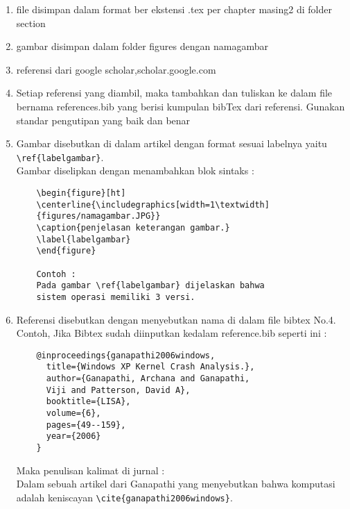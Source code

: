 \begin{enumerate}

    \item file disimpan dalam format ber ekstensi .tex per chapter masing2 di folder section

    \item gambar disimpan dalam folder figures dengan namagambar

    \item referensi dari google scholar,scholar.google.com

    \item Setiap referensi yang diambil, maka tambahkan dan tuliskan ke dalam file bernama references.bib yang berisi kumpulan bibTex dari referensi. Gunakan standar pengutipan yang baik dan benar

    \item Gambar disebutkan di dalam artikel dengan format sesuai labelnya yaitu \\ \verb|\ref{labelgambar}|. \\ Gambar diselipkan dengan menambahkan blok sintaks :
    \begin{verbatim}
    \begin{figure}[ht]
    \centerline{\includegraphics[width=1\textwidth]
    {figures/namagambar.JPG}}
    \caption{penjelasan keterangan gambar.}
    \label{labelgambar}
    \end{figure}
    
    Contoh :
    Pada gambar \ref{labelgambar} dijelaskan bahwa 
    sistem operasi memiliki 3 versi.
    \end{verbatim}

    \item Referensi disebutkan dengan menyebutkan nama di dalam file bibtex No.4. \\
    Contoh, Jika Bibtex sudah diinputkan kedalam reference.bib seperti ini :
    \begin{verbatim}
    @inproceedings{ganapathi2006windows,
      title={Windows XP Kernel Crash Analysis.},
      author={Ganapathi, Archana and Ganapathi, 
      Viji and Patterson, David A},
      booktitle={LISA},
      volume={6},
      pages={49--159},
      year={2006}
    }
    \end{verbatim}
    Maka penulisan kalimat di jurnal : \\
    Dalam sebuah artikel dari Ganapathi yang 
    menyebutkan bahwa komputasi adalah keniscayan \verb|\cite{ganapathi2006windows}|.
    

\end{enumerate}
